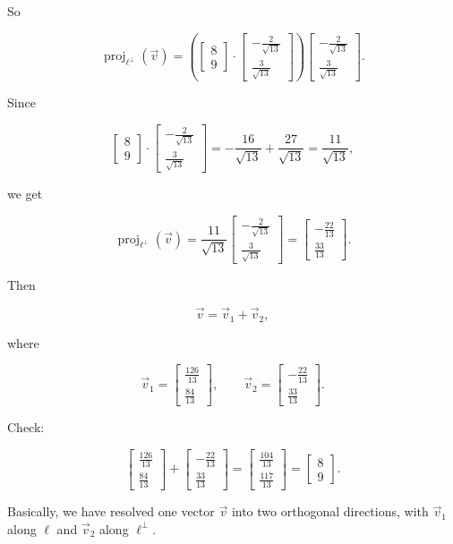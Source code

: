 So

\[
\operatorname{proj}_{\ell^\perp}(\vec v)
=
\left(
\begin{bmatrix}
8\\
9
\end{bmatrix}
\cdot
\begin{bmatrix}
-\frac{2}{\sqrt{13}}\\[2pt]
\frac{3}{\sqrt{13}}
\end{bmatrix}
\right)
\begin{bmatrix}
-\frac{2}{\sqrt{13}}\\[2pt]
\frac{3}{\sqrt{13}}
\end{bmatrix}.
\]

Since

\[
\begin{bmatrix}
8\\
9
\end{bmatrix}
\cdot
\begin{bmatrix}
-\frac{2}{\sqrt{13}}\\[2pt]
\frac{3}{\sqrt{13}}
\end{bmatrix}
=
-\frac{16}{\sqrt{13}}+\frac{27}{\sqrt{13}}
=
\frac{11}{\sqrt{13}},
\]

we get

\[
\operatorname{proj}_{\ell^\perp}(\vec v)
=
\frac{11}{\sqrt{13}}
\begin{bmatrix}
-\frac{2}{\sqrt{13}}\\[2pt]
\frac{3}{\sqrt{13}}
\end{bmatrix}
=
\begin{bmatrix}
-\frac{22}{13}\\[2pt]
\frac{33}{13}
\end{bmatrix}.
\]

Then

\[
\vec v
=
\vec v_1+\vec v_2,
\]

where

\[
\vec v_1=
\begin{bmatrix}
\frac{126}{13}\\[2pt]
\frac{84}{13}
\end{bmatrix},
\qquad
\vec v_2=
\begin{bmatrix}
-\frac{22}{13}\\[2pt]
\frac{33}{13}
\end{bmatrix}.
\]

Check:

\[
\begin{bmatrix}
\frac{126}{13}\\[2pt]
\frac{84}{13}
\end{bmatrix}
+
\begin{bmatrix}
-\frac{22}{13}\\[2pt]
\frac{33}{13}
\end{bmatrix}
=
\begin{bmatrix}
\frac{104}{13}\\[2pt]
\frac{117}{13}
\end{bmatrix}
=
\begin{bmatrix}
8\\
9
\end{bmatrix}.
\]

Basically, we have resolved one vector $\vec v$ into two orthogonal directions,
with $\vec v_1$ along $\ell$ and $\vec v_2$ along $\ell^\perp$.
